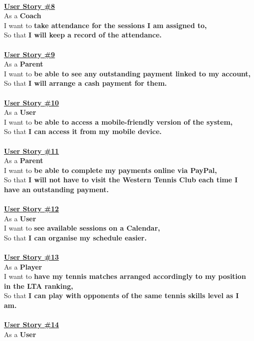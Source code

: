 \documentclass{l3proj}
\begin{document}
\\
\textbf{\underline{User Story \#8}}\\
As a \textbf{Coach}\\
I want to \textbf{take attendance for the sessions I am assigned to,}\\
So that \textbf{I will keep a record of the attendance.}\\
\\
\textbf{\underline{User Story \#9}}\\
As a \textbf{Parent}\\
I want to \textbf{be able to see any outstanding payment linked to my account,}\\
So that \textbf{I will arrange a cash payment for them.}\\
\\
\textbf{\underline{User Story \#10}}\\
As a \textbf{User}\\
I want to \textbf{be able to access a mobile-friendly version of the system,}\\
So that \textbf{I can access it from my mobile device.}\\
\\
\textbf{\underline{User Story \#11}}\\
As a \textbf{Parent}\\
I want to \textbf{be able to complete my payments online via PayPal,}\\
So that \textbf{I will not have to visit the Western Tennis Club each time I have an outstanding payment.}\\
\\
\textbf{\underline{User Story \#12}}\\
As a \textbf{User}\\
I want to \textbf{see available sessions on a Calendar,}\\
So that \textbf{I can organise my schedule easier.}\\
\\
\textbf{\underline{User Story \#13}}\\
As a \textbf{Player}\\
I want to \textbf{have my tennis matches arranged accordingly to my position in the LTA ranking,}\\
So that \textbf{I can play with opponents of the same tennis skills level as I am.}\\
\\
\textbf{\underline{User Story \#14}}\\
As a \textbf{User}\\
\end{document}
